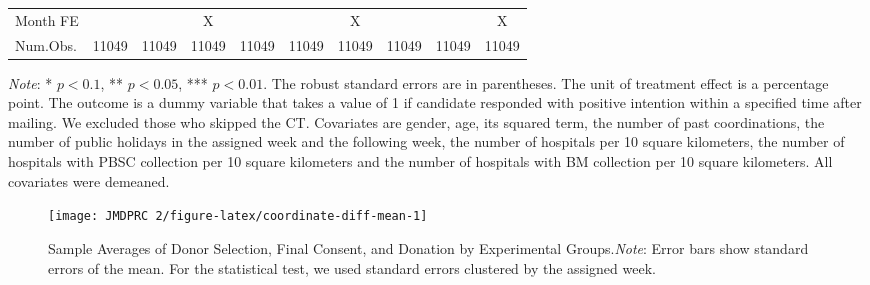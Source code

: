 \documentclass[12pt, a4paper]{article}
\begin{document}
\begin{table}[H]
\begin{threeparttable}
\begin{tabular}[t]{>{\raggedright\arraybackslash}p{20em}ccccccccc}
Month FE &  &  & X &  &  & X &  &  & X\\
Num.Obs. & \num{11049} & \num{11049} & \num{11049} & \num{11049} & \num{11049} & \num{11049} & \num{11049} & \num{11049} & \num{11049}\\
\bottomrule
\end{tabular}
\begin{tablenotes}
\item \emph{Note}: * $p < 0.1$, ** $p < 0.05$, *** $p < 0.01$. The robust standard errors are in parentheses. The unit of treatment effect is a percentage point. The outcome is a dummy variable that takes a value of 1 if candidate responded with positive intention within a specified time after mailing. We excluded those who skipped the CT. Covariates are gender, age, its squared term, the number of past coordinations, the number of public holidays in the assigned week and the following week, the number of hospitals per 10 square kilometers, the number of hospitals with PBSC collection per 10 square kilometers and the number of hospitals with BM collection per 10 square kilometers. All covariates were demeaned.
\end{tablenotes}
\end{threeparttable}
\end{table}

\begin{figure}[H]
\texttt{[image: JMDPRC~2/figure-latex/coordinate-diff-mean-1]} \caption{Sample Averages of Donor Selection, Final Consent, and Donation by Experimental Groups.\newline \emph{Note}: Error bars show standard errors of the mean. For the statistical test, we used standard errors clustered by the assigned week.}\label{fig:coordinate-diff-mean}
\end{figure}
\end{document}
